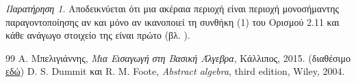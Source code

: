 \documentclass[12pt,a4paper,reqno]{amsart}
\theoremstyle{definition}
\theoremstyle{remark}
\newtheorem*{remark}{Παρατήρηση}
\numberwithin{theorem}{section}
\numberwithin{exercise}{section}
\numberwithin{equation}{section}
\begin{document}
\begin{remark}
Αποδεικνύεται ότι μια ακέραια περιοχή είναι περιοχή μονοσήμαντης παραγο\-ντοποίησης αν και μόνο αν ικανοποιεί τη συνθήκη (1) του Ορισμού 2.11 και κάθε ανάγωγο στοιχείο της είναι πρώτο (βλ. \cite[Θεώρημα~11.4.12]{Mpe15}).
\end{remark}
 
\begin{thebibliography}{99}
    Α. Μπελιγιάννης, 
    \textit{Μια Εισαγωγή στη Βασική Άλγεβρα},
    Κάλλιπος, 2015. (διαθέσιμο \href{https://dx.doi.org/10.57713/kallipos-547}{εδώ})
    D. S. Dummit και R. M. Foote, 
    \textit{Abstract algebra},
    third edition, Wiley, 2004. 
\end{thebibliography}
\end{document}
